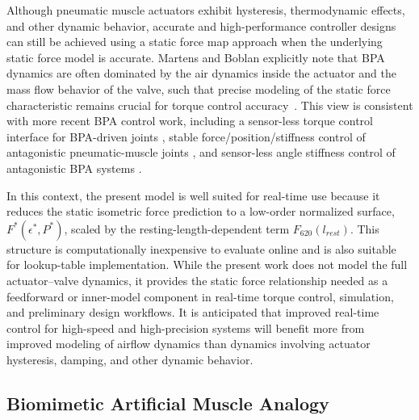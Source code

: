 \documentclass[actuators,article,accept,pdftex,moreauthors]{Definitions/mdpi}
\begin{document}
Although pneumatic muscle actuators exhibit hysteresis, thermodynamic effects, and other dynamic behavior, accurate and high-performance controller designs can still be achieved using a static force map approach when the underlying static force model is accurate. Martens and Boblan explicitly note that BPA dynamics are often dominated by the air dynamics inside the actuator and the mass flow behavior of the valve, such that precise modeling of the static force characteristic remains crucial for torque control \mbox{accuracy \citep{martens_modeling_2017}.} This view is consistent with more recent BPA control work, including a sensor-less torque control interface for BPA-driven joints \citep{martens_framework_2018}, stable force/position/stiffness control of antagonistic pneumatic-muscle joints \citep{ugurlu2019stable, hunt_development_2017}, and sensor-less angle stiffness control of antagonistic BPA systems \citep{shinSensorlessAngleStiffness2022}. 

In this context, the present model is well suited for real-time use because it reduces the static isometric force prediction to a low-order normalized surface, $F^*(\epsilon^*,P^*)$, scaled by the resting-length-dependent term $F_{620}(l_{rest})$. This structure is computationally inexpensive to evaluate online and is also suitable for lookup-table implementation. While the present work does not model the full actuator--valve dynamics, it provides the static force relationship needed as a feedforward or inner-model component in real-time torque control, simulation, and preliminary design workflows. It is anticipated that improved real-time control for high-speed and high-precision systems will benefit more from improved modeling of airflow dynamics than dynamics involving actuator hysteresis, damping, and other dynamic behavior.


\subsection{Biomimetic Artificial Muscle Analogy}
\end{document}

